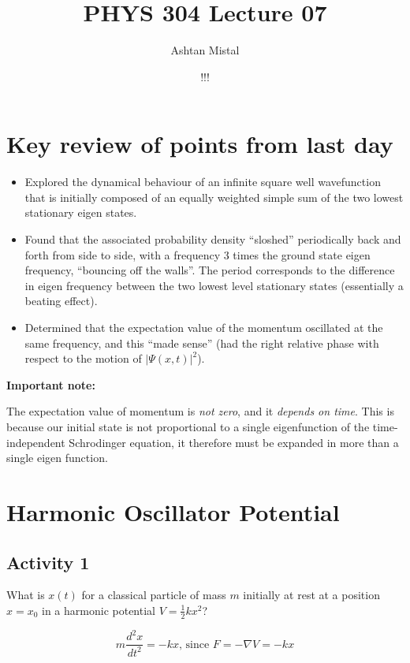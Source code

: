\documentclass{article}
\title{PHYS 304 Lecture 07}
\author{Ashtan Mistal}
\date{!!!}
\begin{document}
\ifstandalone
\maketitle
\fi

\graphicspath{{./Lecture07/}}

\section{Key review of points from last day}

\begin{itemize}
    \item Explored the dynamical behaviour of an infinite square well wavefunction that is initially composed of an equally weighted simple sum of the two lowest stationary eigen states.
    \item Found that the associated probability density “sloshed” periodically back and forth from side to side, with a frequency 3 times the ground state eigen frequency, “bouncing off the walls”.  The period corresponds to the difference in eigen frequency between the two lowest level stationary states (essentially a beating effect). 
    \item Determined that the expectation value of the momentum oscillated at the same frequency, and this “made sense” (had the right relative phase with respect to the motion of $|\Psi(x,t)|^2$).
\end{itemize}

\textbf{Important note:}

The expectation value of momentum is \textit{not zero}, and it \textit{depends on time}. This is because our initial state is not proportional to a single eigenfunction of the time-independent Schrodinger equation, it therefore must be expanded in more than a single eigen function. 


\section{Harmonic Oscillator Potential}

\subsection{Activity 1}

What is $x(t)$ for a classical particle of mass $m$ initially at rest at a position $x = x_0$ in a harmonic potential $V = \frac{1}{2} kx^2$?

$$m \frac{d^2 x}{dt^2} = -kx \text{, since } F = - \nabla V = -kx$$
\end{document}
